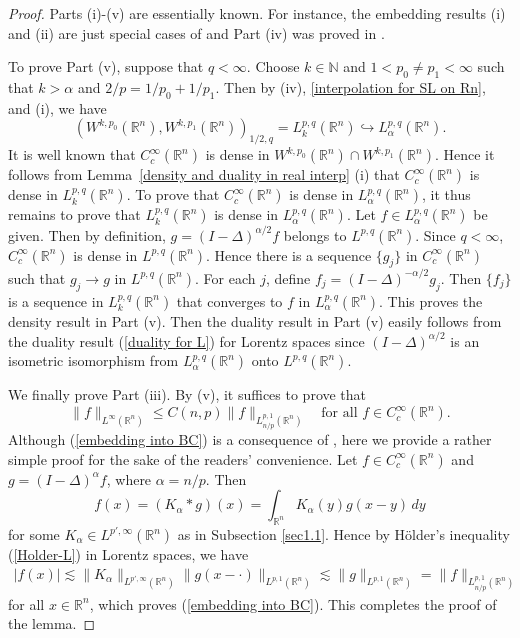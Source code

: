 \documentclass[reqno,centertags,11pt]{amsart}
\theoremstyle{definition}
\numberwithin{thm}{section}
\numberwithin{equation}{section}
\newcommand{\N}{{\mathbb{N}}}
\newcommand{\R}{{\mathbb{R}}}
\begin{document}
\begin{proof}
Parts (i)-(v)  are essentially known.
For instance, the embedding results (i) and (ii) are just special cases of \cite[Theorem 5.2]{BKO} and Part (iv) was proved in \cite[Theorem  5.5]{BKO}. %

To prove Part (v), suppose that $q<\infty$. Choose  $k\in \N$ and  $ 1<  p_0 \neq p_1 < \infty $ such that  $k>\alpha$ and  $2/p =1/p_0 + 1 /p_1$. Then by (iv), \eqref{interpolation for SL on Rn},  and (i),  we have
$$
\left( W^{k, p_0 }(\R^n ), W^{k, p_1}(\R^n ) \right)_{1/2,q} = L_k^{p,q}(\R^n )\hookrightarrow L_{\alpha}^{p,q }(\R^n ).
$$
It is well known that $C^\infty_c(\R^n )$ is dense in $W^{k, p_0 }(\R^n )\cap W^{k, p_1}(\R^n )$. Hence it follows from Lemma~\ref{density and duality in real interp} (i) that   $C^\infty_c(\R^n )$ is dense in $L_k^{p,q}(\R^n )$.
To prove that  $C_c^\infty (\R^n)$ is dense in  $L_\alpha^{p,q}(\R^n)$, it thus remains to prove that $L_k^{p,q}(\R^n )$ is dense in  $L_{\alpha}^{p,q }(\R^n )$. Let $f\in L_{\alpha}^{p,q }(\R^n )$ be given. Then by definition,  $g =(I-\Delta )^{\alpha/2}f$  belongs to $L^{p,q}(\R^n )$. Since $q<\infty$,  $C_c^\infty (\R^n)$ is dense in  $L^{p,q}(\R^n)$. Hence there is a sequence  $\{g_j \}$  in $C_c^\infty (\R^n)$ such that $g_j \to g$ in $L^{p,q}(\R^n)$. For each $j$, define $f_j = (I-\Delta )^{-\alpha/2}g_j$. Then   $\{ f_j  \}$ is a sequence in $L_k^{p,q}(\R^n )$ that converges to  $ f$ in $L_{\alpha}^{p,q }(\R^n )$.  This proves  the density result in Part (v).
Then the duality result in Part (v)  easily follows from the duality result (\ref{duality for L}) for Lorentz spaces since $(I-\Delta )^{\alpha/2}$ is an isometric isomorphism from $L_\alpha^{p,q}(\R^n )$ onto $ L^{p,q}(\R^n )$.



We finally  prove Part (iii). By (v), it suffices to prove that
\begin{equation}\label{embedding into BC}
\|f\|_{L^\infty (\R^n )} \le C(n,p) \|f\|_{L_{n/p}^{p,1 }(\R^n )} \quad \mbox{for all}\,\, f \in C^\infty_c(\R^n ).
\end{equation}
Although (\ref{embedding into BC}) is a consequence of \cite[Theorem  5.8 (iii)]{BKO}, here we provide a rather simple  proof for the sake of the readers' convenience.
Let $f \in C_c^\infty (\R^n)$  and $g = (I-\Delta )^{\alpha} f$, where $\alpha=n/p$. Then
\[
f (x)= (K_\alpha * g )(x) =\int_{\R^n} K_\alpha (y) g(x-y)\, dy
\]
for some  $K_\alpha  \in L^{p',\infty} (\R^n )$ as   in Subsection \ref{sec1.1}. Hence by H\"older's inequality (\ref{Holder-L}) in Lorentz spaces, we have
\begin{align*}
|f(x)| \lesssim \|K_{\alpha} \|_{L^{p',\infty} (\R^n )} \|g(x-\cdot ) \|_{L^{p,1} (\R^n )}  \lesssim   \|g  \|_{L^{p,1} (\R^n )} =   \|f \|_{L_{n/p}^{p,1}(\R^n)}
\end{align*}
for   all  $x\in \R^n$, which proves  (\ref{embedding into BC}).
 This completes the proof of the lemma.
\end{proof}
\end{document}
